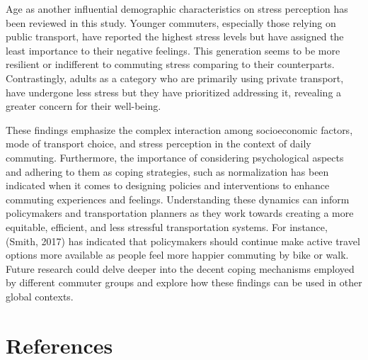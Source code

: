 \documentclass[
11pt, %
oneside, %
english, %
singlespacing, %
]{macthesis} %
\begin{document}
Age as another influential demographic characteristics on stress perception has been reviewed in this study. Younger commuters, especially those relying on public transport, have reported the highest stress levels but have assigned the least importance to their negative feelings. This generation seems to be more resilient or indifferent to commuting stress comparing to their counterparts. Contrastingly, adults as a category who are primarily using private transport, have undergone less stress but they have prioritized addressing it, revealing a greater concern for their well-being.

These findings emphasize the complex interaction among socioeconomic factors, mode of transport choice, and stress perception in the context of daily commuting. Furthermore, the importance of considering psychological aspects and adhering to them as coping strategies, such as normalization has been indicated when it comes to designing policies and interventions to enhance commuting experiences and feelings. Understanding these dynamics can inform policymakers and transportation planners as they work towards creating a more equitable, efficient, and less stressful transportation systems. For instance, (Smith, 2017) has indicated that policymakers should continue make active travel options more available as people feel more happier commuting by bike or walk. Future research could delve deeper into the decent coping mechanisms employed by different commuter groups and explore how these findings can be used in other global contexts.

\backmatter

\hypertarget{references}{%
\chapter*{References}\label{references}}


\noindent

\setlength{\parindent}{-0.20in}
\setlength{\leftskip}{0.20in}
\setlength{\parskip}{8pt}
\end{document}
